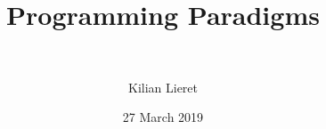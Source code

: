 %
\title{Programming Paradigms}
\subtitle{\ \relax}
\author{Kilian Lieret}
\newcommand*{\coauthors}{}
\date{27 March 2019}
%
%
%